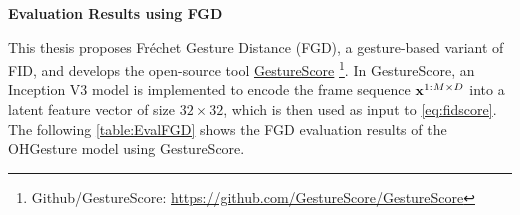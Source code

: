 \begin{table}[h]
	\centering
	\caption{Mean Square Error results across 6 emotion categories}
	\label{table:EvaluationMSE}
\end{table}

\textbf{Evaluation Results using FGD}

This thesis proposes Fréchet Gesture Distance (FGD), a gesture-based variant of FID, and develops the open-source tool \hyperlink{https://github.com/GestureScore/GestureScore}{GestureScore} \footnote{Github/GestureScore: \url{https://github.com/GestureScore/GestureScore}}. In GestureScore, an Inception V3 model is implemented to encode the frame sequence $\mathbf{x}^{1:M \times D}$ into a latent feature vector of size $32 \times 32$, which is then used as input to \autoref{eq:fidscore}. The following \autoref{table:EvalFGD} shows the FGD evaluation results of the OHGesture model using GestureScore.


